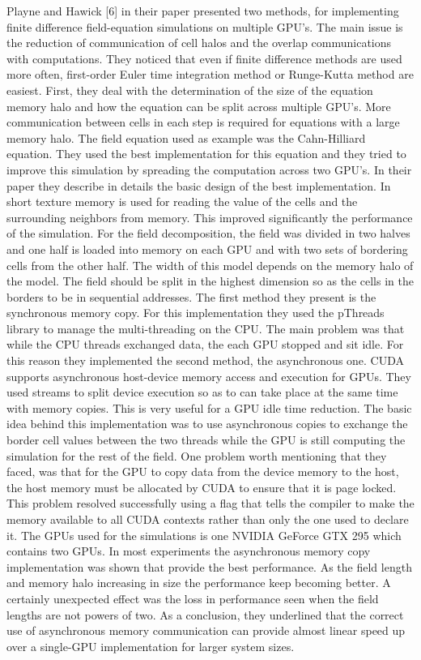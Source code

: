 Playne and Hawick [6] in their paper presented two methods, for implementing finite difference field-equation simulations on multiple GPU’s. The main issue is the reduction of communication of cell halos and the overlap communications with computations. They noticed that even if finite difference methods are used more often, first-order Euler time integration method or Runge-Kutta method are easiest. First, they deal with the determination of the size of the equation memory halo and how the equation can be split across multiple GPU’s. More communication between cells in each step is required for equations with a large memory halo. The field equation used as example was the Cahn-Hilliard equation. They used the best implementation for this equation and they tried to improve this simulation by spreading the computation across two GPU’s. In their paper they describe in details the basic design of the best implementation. In short texture memory is used for reading the value of the cells and the surrounding neighbors from memory. This improved significantly the performance of the simulation. For the field decomposition, the field was divided in two halves and one half is loaded into memory on each GPU and with two sets of bordering cells from the other half. The width of this model depends on the memory halo of the model. The field should be split in the highest dimension so as the cells in the borders to be in sequential addresses. The first method they present is the synchronous memory copy. For this implementation they used the pThreads library to manage the multi-threading on the CPU. The main problem was that while the CPU threads exchanged data, the each GPU stopped and sit idle. For this reason they implemented the second method, the asynchronous one. CUDA supports asynchronous host-device memory access and execution for GPUs. They used streams to split device execution so as to can take place at the same time with memory copies. This is very useful for a GPU idle time reduction. The basic idea behind this implementation was to use asynchronous copies to exchange the border cell values between the two threads while the GPU is still computing the simulation for the rest of the field. One problem worth mentioning that they faced, was that for the GPU to copy data from the device memory to the host, the host memory must be allocated by CUDA to ensure that it is page locked. This problem resolved successfully using a flag that tells the compiler to make the memory available to all CUDA contexts rather than only the one used to declare it. The GPUs used for the simulations is one NVIDIA GeForce GTX 295 which contains two GPUs. In most experiments the asynchronous memory copy implementation was shown that provide the best performance. As the field length and memory halo increasing in size the performance keep becoming better. A certainly unexpected effect was the loss in performance seen when the field lengths are not powers of two. As a conclusion, they underlined that the correct use of asynchronous memory communication can provide almost linear speed up over a single-GPU implementation for larger system sizes.


